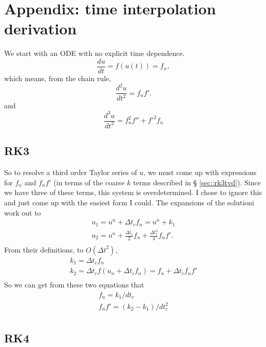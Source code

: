 \documentclass{article}
\newcommand{\dt}{{\Delta t}}
\begin{document}
\section{Appendix: time interpolation derivation}
We start with an ODE  with no explicit time dependence.
$$
\frac{du}{dt} = f(u(t)) = f_n,
$$
which means, from the chain rule,
$$
\frac{d^2u}{dt^2} = f_nf'.
$$
and
$$
\frac{d^3u}{dt^3} =  f_n^2 f'' + {f'}^2f_n
$$


\subsection{RK3}
\label{sec::rk3deriv}
So to resolve a third order Taylor series of $u$, we must come up with
expressions for $f_n$ and $f_n f'$ (in terms of the coarse $k$ terms described in \S
\ref{sec::rk3tvd}).    Since we  have three of these terms, this system
is overdetermined.   I chose to ignore this and just come up with the
easiest form I could.  The expansions of the solutioni work out to
$$
\begin{array}{l}
u_1 = u^n + \dt_c f_n = u^n + k_1 \\
u_2 = u^n + \frac{\dt_c}{2} f_n  + \frac{\dt_c^2}{4} f_n f'.\\
\end{array}
$$
From their definitions, to $O(\dt^2)$,
$$
\begin{array}{l}
k_1 = \dt_c f_n  \\
k_2 = \dt_c f(u_n + \dt_c  f_n) = f_n + \dt_c f_n f' \\
\end{array}
$$
So we can get from these two equations that
$$
\begin{array}{l}
f_n = k_1/dt_c  \\
f_n f' = (k_2 - k_1)/dt_c^2\\
\end{array}
$$

\subsection{RK4}
\label{sec::rk4deriv}
\end{document}
